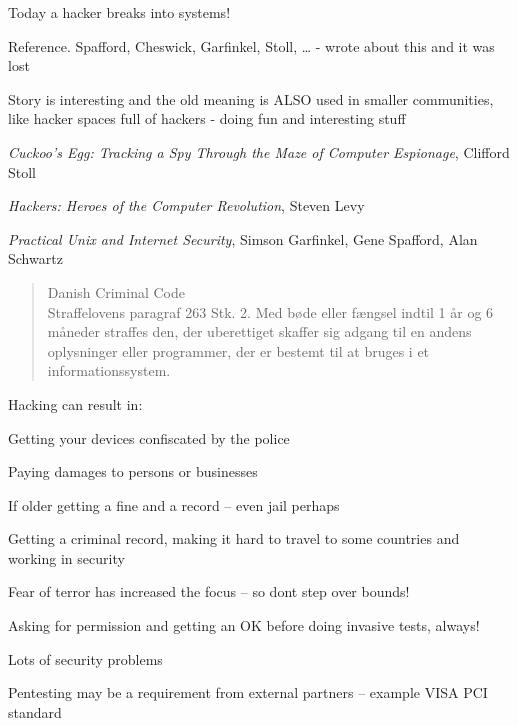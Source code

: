 \documentclass[Screen16to9,17pt]{foils}
\begin{document}
{\color{red}\hlkbig Today a hacker breaks into systems!}

Reference. Spafford, Cheswick, Garfinkel, Stoll, \ldots
- wrote about this and it was lost

Story is interesting and the old meaning is ALSO used in smaller communities, like hacker spaces full of hackers - doing fun and interesting stuff
\begin{list2}
\item \emph{Cuckoo's Egg: Tracking a Spy Through the Maze of Computer
 Espionage},  Clifford Stoll
\item \emph{Hackers: Heroes of the Computer Revolution},
Steven Levy
\item \emph{Practical Unix and Internet Security},
Simson Garfinkel, Gene Spafford, Alan Schwartz
\end{list2}


\begin{quote}\small
Danish Criminal Code\\
Straffelovens paragraf 263 Stk. 2. Med bøde eller fængsel indtil 1 år og 6 måneder straffes den, der uberettiget skaffer sig adgang til en andens oplysninger eller programmer, der er bestemt til at bruges i et informationssystem.
\end{quote}

Hacking can result in:
\begin{list2}
\item Getting your devices confiscated by the police
\item Paying damages to persons or businesses
\item If older getting a fine and a record -- even jail perhaps
\item Getting a criminal record, making it hard to travel to some countries and working in security
\item Fear of terror has increased the focus -- so dont step over bounds!
\end{list2}

Asking for permission and getting an OK before doing invasive tests, always!



\begin{list1}
\item Lots of security problems
\item Pentesting may be a requirement from external partners -- example VISA PCI standard
\end{list1}
\end{document}
